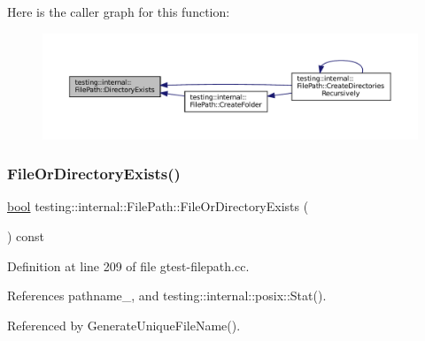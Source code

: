 Here is the caller graph for this function\+:
\nopagebreak
\begin{figure}[H]
\begin{center}
\leavevmode
\includegraphics[width=350pt]{classtesting_1_1internal_1_1FilePath_a74ba8435e822d77f79f137c38de9bfeb_icgraph}
\end{center}
\end{figure}
\mbox{\label{classtesting_1_1internal_1_1FilePath_a105bd8fc3adff8fcb4a593532842fb68}} 
\subsubsection{\texorpdfstring{File\+Or\+Directory\+Exists()}{FileOrDirectoryExists()}}
{\footnotesize\ttfamily \hyperlink{classbool}{bool} testing\+::internal\+::\+File\+Path\+::\+File\+Or\+Directory\+Exists (\begin{DoxyParamCaption}{ }\end{DoxyParamCaption}) const}



Definition at line 209 of file gtest-\/filepath.\+cc.



References pathname\+\_\+, and testing\+::internal\+::posix\+::\+Stat().



Referenced by Generate\+Unique\+File\+Name().


